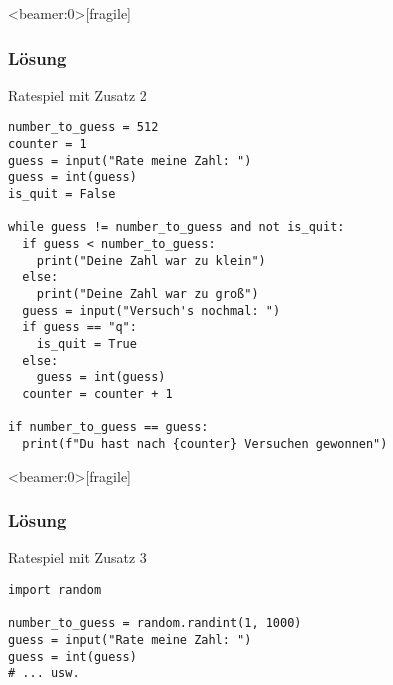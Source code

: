 \begin{frame}<beamer:0>[fragile]
\frametitle{Lösung}
\begin{solutionblock}{Ratespiel mit Zusatz 2}
\begin{verbatim}
number_to_guess = 512
counter = 1
guess = input("Rate meine Zahl: ")
guess = int(guess)
is_quit = False

while guess != number_to_guess and not is_quit:
  if guess < number_to_guess:
    print("Deine Zahl war zu klein")
  else:
    print("Deine Zahl war zu groß")
  guess = input("Versuch's nochmal: ")
  if guess == "q":
    is_quit = True
  else: 
    guess = int(guess)
  counter = counter + 1

if number_to_guess == guess: 
  print(f"Du hast nach {counter} Versuchen gewonnen")	
\end{verbatim}
\end{solutionblock}
\end{frame}




\begin{frame}<beamer:0>[fragile]
\frametitle{Lösung}
\begin{solutionblock}{Ratespiel mit Zusatz 3}
\begin{verbatim}
import random 

number_to_guess = random.randint(1, 1000)
guess = input("Rate meine Zahl: ")
guess = int(guess)
# ... usw. 
\end{verbatim}
\end{solutionblock}
\end{frame}







	




